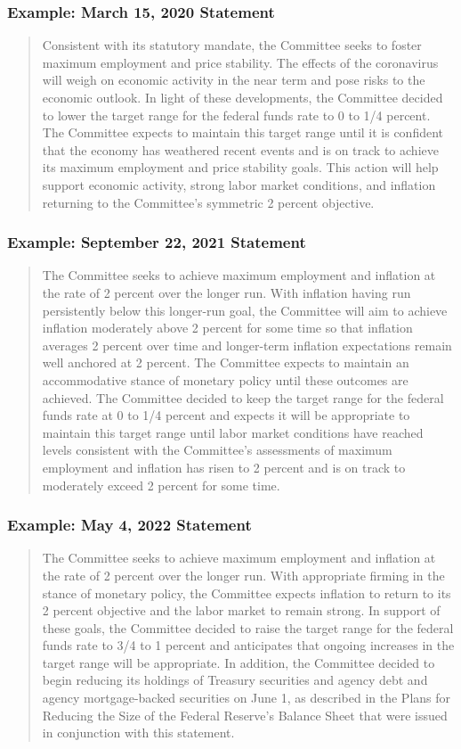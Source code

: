 \documentclass[english,xcolor=svgnames]{beamer}
\begin{document}
\begin{frame}
\frametitle{Example: March 15, 2020 Statement}
\begin{quotation}
Consistent with its statutory mandate, the Committee seeks to foster maximum employment and price stability. The effects of the coronavirus will weigh on economic activity in the near term and pose risks to the economic outlook. In light of these developments, the Committee decided to lower the target range for the federal funds rate to 0 to 1/4 percent. The Committee expects to maintain this target range until it is confident that the economy has weathered recent events and is on track to achieve its maximum employment and price stability goals. This action will help support economic activity, strong labor market conditions, and inflation returning to the Committee's symmetric 2 percent objective.
\end{quotation}
\end{frame}



\begin{frame}
\frametitle{Example: September 22, 2021 Statement}
\begin{quotation}
The Committee seeks to achieve maximum employment and inflation at the rate of 2 percent over the longer run. With inflation having run persistently below this longer-run goal, the Committee will aim to achieve inflation moderately above 2 percent for some time so that inflation averages 2 percent over time and longer-term inflation expectations remain well anchored at 2 percent. The Committee expects to maintain an accommodative stance of monetary policy until these outcomes are achieved. The Committee decided to keep the target range for the federal funds rate at 0 to 1/4 percent and expects it will be appropriate to maintain this target range until labor market conditions have reached levels consistent with the Committee's assessments of maximum employment and inflation has risen to 2 percent and is on track to moderately exceed 2 percent for some time.
\end{quotation}
\end{frame}

\begin{frame}
\frametitle{Example: May 4, 2022 Statement}
\begin{quotation}
The Committee seeks to achieve maximum employment and inflation at the rate of 2 percent over the longer run. With appropriate firming in the stance of monetary policy, the Committee expects inflation to return to its 2 percent objective and the labor market to remain strong. In support of these goals, the Committee decided to raise the target range for the federal funds rate to 3/4 to 1 percent and anticipates that ongoing increases in the target range will be appropriate. In addition, the Committee decided to begin reducing its holdings of Treasury securities and agency debt and agency mortgage-backed securities on June 1, as described in the Plans for Reducing the Size of the Federal Reserve's Balance Sheet that were issued in conjunction with this statement.
\end{quotation}
\end{frame}
\end{document}
